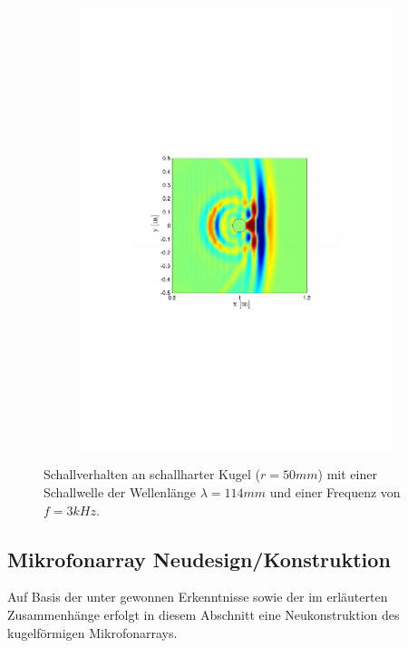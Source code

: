 \begin{figure}
\begin{subfigure}[b]{0.48\textwidth}
                \includegraphics[width=\textwidth]{grafiken/02_Konzeptionierung/sim_wave_3000_4}
        \end{subfigure}
        \caption{Schallverhalten an schallharter Kugel ($r=50mm$) mit einer Schallwelle der Wellenlänge $\lambda = 114mm$ und einer Frequenz von $f=3kHz$.}
        \label{fig:sim_wave_3000}
\end{figure}






\subsection{Mikrofonarray Neudesign/Konstruktion}
\label{subsec:MikrofonarrayNeudesign}
Auf Basis der unter  gewonnen Erkenntnisse sowie der im  erläuterten Zusammenhänge erfolgt in diesem Abschnitt eine Neukonstruktion des kugelförmigen Mikrofonarrays.

